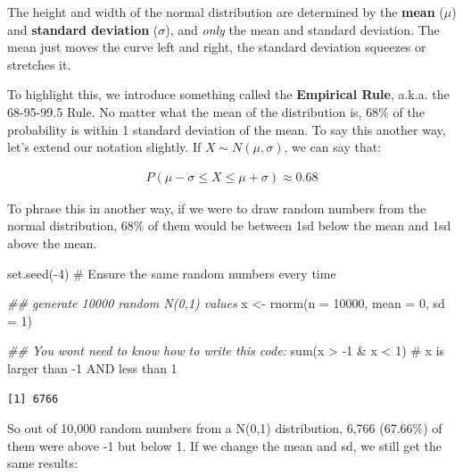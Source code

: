 \documentclass[
  letterpaper,
  DIV=11,
  numbers=noendperiod,
  oneside]{scrreprt}
\newenvironment{Shaded}{\begin{snugshade}}{\end{snugshade}}
\newcommand{\AttributeTok}[1]{\textcolor[rgb]{0.40,0.45,0.13}{#1}}
\newcommand{\CommentTok}[1]{\textcolor[rgb]{0.37,0.37,0.37}{#1}}
\newcommand{\DecValTok}[1]{\textcolor[rgb]{0.68,0.00,0.00}{#1}}
\newcommand{\DocumentationTok}[1]{\textcolor[rgb]{0.37,0.37,0.37}{\textit{#1}}}
\newcommand{\FunctionTok}[1]{\textcolor[rgb]{0.28,0.35,0.67}{#1}}
\newcommand{\NormalTok}[1]{\textcolor[rgb]{0.00,0.23,0.31}{#1}}
\newcommand{\OtherTok}[1]{\textcolor[rgb]{0.00,0.23,0.31}{#1}}
\newcommand{\SpecialCharTok}[1]{\textcolor[rgb]{0.37,0.37,0.37}{#1}}
\begin{document}
The height and width of the normal distribution are determined by the
\textbf{mean} (\(\mu\)) and \textbf{standard deviation} (\(\sigma\)),
and \emph{only} the mean and standard deviation. The mean just moves the
curve left and right, the standard deviation squeezes or stretches it.

To highlight this, we introduce something called the \textbf{Empirical
Rule}, a.k.a. the 68-95-99.5 Rule. No matter what the mean of the
distribution is, 68\% of the probability is within 1 standard deviation
of the mean. To say this another way, let's extend our notation
slightly. If \(X\sim N(\mu,\sigma)\), we can say that:

\begin{align*}
P(\mu - \sigma \le X \le \mu + \sigma) \approx 0.68
\end{align*}

To phrase this in another way, if we were to draw random numbers from
the normal distribution, 68\% of them would be between 1sd below the
mean and 1sd above the mean.

\begin{Shaded}
\begin{Highlighting}[]
\FunctionTok{set.seed}\NormalTok{(}\SpecialCharTok{{-}}\DecValTok{4}\NormalTok{) }\CommentTok{\# Ensure the same random numbers every time}

\DocumentationTok{\#\# generate 10000 random N(0,1) values}
\NormalTok{x }\OtherTok{\textless{}{-}} \FunctionTok{rnorm}\NormalTok{(}\AttributeTok{n =} \DecValTok{10000}\NormalTok{, }\AttributeTok{mean =} \DecValTok{0}\NormalTok{, }\AttributeTok{sd =} \DecValTok{1}\NormalTok{) }

\DocumentationTok{\#\# You won\textquotesingle{}t need to know how to write this code:}
\FunctionTok{sum}\NormalTok{(x }\SpecialCharTok{\textgreater{}} \SpecialCharTok{{-}}\DecValTok{1} \SpecialCharTok{\&}\NormalTok{ x }\SpecialCharTok{\textless{}} \DecValTok{1}\NormalTok{) }\CommentTok{\# x is larger than {-}1 AND less than 1}
\end{Highlighting}
\end{Shaded}

\begin{verbatim}
[1] 6766
\end{verbatim}

So out of 10,000 random numbers from a N(0,1) distribution, 6,766
(67.66\%) of them were above -1 but below 1. If we change the mean and
sd, we still get the same results:
\end{document}
